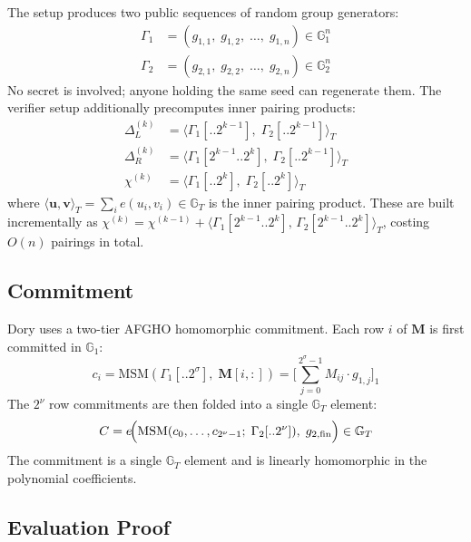 The setup produces two public sequences of random group generators:
\begin{align}
    \Gamma_1 &= (g_{1,1},\; g_{1,2},\; \ldots,\; g_{1,n}) \in \mathbb{G}_1^n \\
    \Gamma_2 &= (g_{2,1},\; g_{2,2},\; \ldots,\; g_{2,n}) \in \mathbb{G}_2^n
\end{align}
No secret is involved; anyone holding the same seed can regenerate them.
The verifier setup additionally precomputes inner pairing products:
\begin{align}
    \Delta_L^{(k)} &=
        \bigl\langle \Gamma_1[..2^{k-1}],\;\Gamma_2[..2^{k-1}]\bigr\rangle_T \\
    \Delta_R^{(k)} &=
        \bigl\langle \Gamma_1[2^{k-1}..2^k],\;\Gamma_2[..2^{k-1}]\bigr\rangle_T \\
    \chi^{(k)} &=
        \bigl\langle \Gamma_1[..2^k],\;\Gamma_2[..2^k]\bigr\rangle_T
\end{align}
where $\langle \mathbf{u},\mathbf{v}\rangle_T = \sum_i e(u_i, v_i) \in
\mathbb{G}_T$ is the inner pairing product. These are built incrementally as
$\chi^{(k)} = \chi^{(k-1)} + \langle \Gamma_1[2^{k-1}..2^k],\,
\Gamma_2[2^{k-1}..2^k]\rangle_T$, costing $O(n)$ pairings in total.

\subsection{Commitment}

Dory uses a two-tier AFGHO homomorphic commitment. Each row $i$ of
$\mathbf{M}$ is first committed in $\mathbb{G}_1$:
\begin{equation}
    c_i = \mathrm{MSM}\!\left(\Gamma_1[..2^\sigma],\; \mathbf{M}[i,:]\right)
        = \Biggl[\sum_{j=0}^{2^\sigma-1} M_{ij}\cdot g_{1,j}\Biggr]_1
\end{equation}
The $2^\nu$ row commitments are then folded into a single $\mathbb{G}_T$
element:
\begin{equation}
    C = e\!\Bigl(\mathrm{MSM}(c_0,\ldots,c_{2^\nu-1};\;\Gamma_2[..2^\nu]),\;
    g_{2,\mathrm{fin}}\Bigr) \in \mathbb{G}_T
\end{equation}
The commitment is a single $\mathbb{G}_T$ element and is linearly homomorphic
in the polynomial coefficients.

\subsection{Evaluation Proof}

